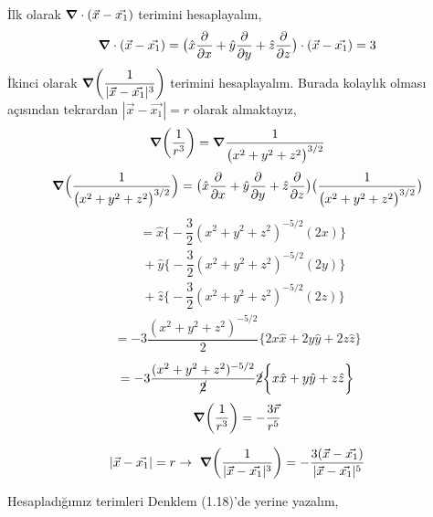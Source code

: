İlk olarak $\grad \cdot (\Vec{x} - \Vec{x_{1}})$ terimini hesaplayalım,
\begin{align}
    \grad \cdot (\Vec{x} - \Vec{x_{1}}) =  \big(  \hat{x} \dfrac{\partial}{\partial x} + \hat{y} \dfrac{\partial}{\partial y} + \hat{z} \dfrac{\partial}{\partial z} \big) \cdot (\Vec{x} - \Vec{x_{1}}) = 3
\end{align}
İkinci olarak $ \grad \bigg( \dfrac{1}{|\Vec{x} - \Vec{x_{1}}|^{3}} \bigg)$ terimini hesaplayalım. Burada kolaylık olması açısından tekrardan $|\Vec{x} - \Vec{x_{1}}| = r $ olarak almaktayız,
\begin{align}
  \grad(\dfrac{1}{r^{3}}) = \grad \dfrac{1}{ \big( x^{2} + y^{2} + z^{2} \big)^{3/2} }
\end{align}
\begin{align}
 \grad \Big( \dfrac{1}{\big(x^{2} + y^{2} + z^{2} \big)^{3/2}}  \Big) = \big(  \hat{x} \dfrac{\partial}{\partial x} + \hat{y} \dfrac{\partial}{\partial y} + \hat{z} \dfrac{\partial}{\partial z} \big) \big( \dfrac{1}{\big( {x^{2} + y^{2} + z^{2}} \big)^{3/2}}  \big)
\end{align}
\begin{align*}
&= \hat{x}  \bigg\{ - \dfrac{3}{2} (x^{2} + y^{2} + z^{2})^{-5/2} (2x) \bigg\} \\
&\ + \hat{y} \bigg\{ - \dfrac{3}{2} (x^{2} + y^{2} + z^{2})^{-5/2} (2y) \bigg\} \\
&\ + \hat{z} \bigg\{ - \dfrac{3}{2} (x^{2} + y^{2} + z^{2})^{-5/2} (2z) \bigg\} 
\end{align*}
\begin{align}
    = - 3 \dfrac{(x^{2} + y^{2} + z^{2})^{-5/2}}{2}  \bigg\{ 2x \hat{x} + 2y \hat{y} + 2z \hat{z} \bigg\} 
\end{align}
\begin{align}
    = - 3 \dfrac{(x^{2} + y^{2} + z^{2})^{-5/2}}{\cancel{2}} \cancel{2} \bigg\{ x \hat{x} + y \hat{y} + z \hat{z} \bigg\} 
\end{align}
\begin{align}
\grad (\dfrac{1}{r^{3}})= -\dfrac{3 \Vec{r}}{r^{5}}
\end{align}

\newpage

\begin{align}
|\Vec{x} - \Vec{x_{1}}| = r \rightarrow \ \grad \bigg( \dfrac{1}{|\Vec{x} - \Vec{x_{1}}|^{3}} \bigg) = - \dfrac{3 (\Vec{x} - \Vec{x_{1}})}{|\Vec{x} - \Vec{x_{1}}|^{5}}
\end{align}

Hesapladığımız terimleri Denklem (1.18)'de yerine yazalım,

